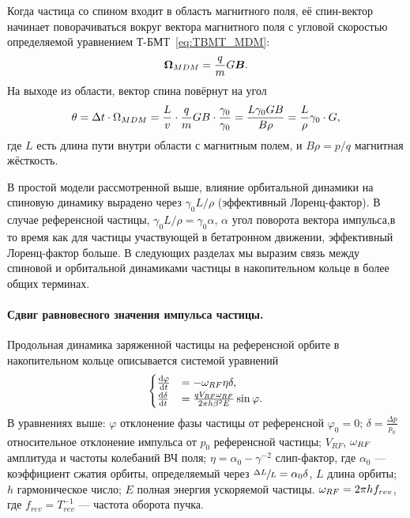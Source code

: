 Когда частица со спином входит в область магнитного поля, её спин-вектор
начинает поворачиваться вокруг вектора магнитного поля с угловой
скоростью определяемой уравнением Т-БМТ~\eqref{eq:TBMT_MDM}:
\begin{equation*}
	\boldsymbol{\Omega}_{MDM} = \frac qm G\boldsymbol B.
\end{equation*}
На выходе из области, вектор спина повёрнут на угол
\begin{equation*}
	\theta = \Delta t\cdot\Omega_{MDM} = \frac Lv \cdot \frac qm GB\cdot \frac{\gamma_0}{\gamma_0} = \frac{L\gamma_0 GB}{B\rho} = \frac L\rho\gamma_0\cdot G,
\end{equation*}
где $L$ есть длина пути внутри области с магнитным полем, и $B\rho =
p/q$ магнитная жёсткость.

В простой модели рассмотренной выше, влияние орбитальной динамики на
спиновую динамику вырадено через $\gamma_0 L/\rho$ (эффективный
Лоренц-фактор). В случае референсной частицы, $\gamma_0L/\rho =
\gamma_0\alpha$, $\alpha$ угол поворота вектора импульса,в то время
как для частицы участвующей в бетатронном движении, эффективный
Лоренц-фактор больше. В следующих разделах мы выразим связь между
спиновой и орбитальной динамиками частицы в накопительном кольце в
более общих терминах.

\paragraph{Сдвиг равновесного значения импульса частицы.}
Продольная динамика заряженной частицы на референсной орбите в
накопительном кольце описывается системой уравнений
\begin{equation*}
	\begin{cases}
		\frac{\mathrm{d} {\varphi}}{\mathrm{d} t} &= -\omega_{RF}\eta\delta, \\
		\frac{\mathrm{d} {\delta}}{\mathrm{d} t} &= \frac{q V_{RF}\omega_{RF}}{2\pi h\beta^2E}\sin\varphi.
	\end{cases}
\end{equation*}
В уравнениях выше: $\varphi$ отклонение фазы частицы от референсной
$\varphi_0 = 0$; $\delta = \frac{\Delta p}{p_0}$ относительное
отклонение импульса от $p_0$ референсной частицы; $V_{RF}$, $\omega_{RF}$
амплитуда и частоты колебаний ВЧ поля; $\eta = \alpha_0 - \gamma^{-2}$
слип-фактор, где $\alpha_0$ --- коэффициент сжатия орбиты, определяемый
через $\sfrac{\Delta L}{L} = \alpha_0\delta$, $L$ длина орбиты; $h$
гармоническое число; $E$ полная энергия ускоряемой частицы. $\omega_{RF} =
2\pi h f_{rev}$, где $f_{rev}=T_{rev}^{-1}$ --- частота оборота пучка.

